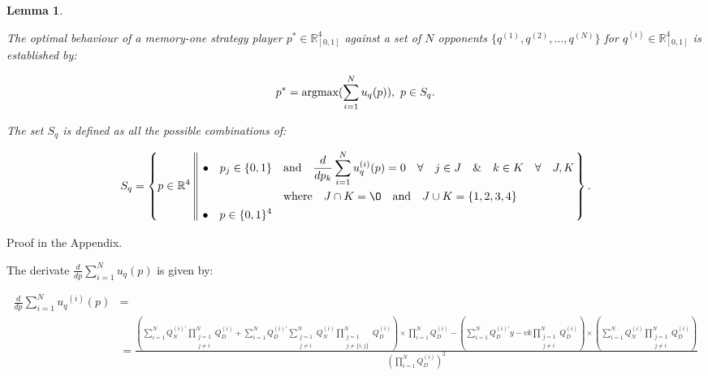 \documentclass[10pt]{article}
\newcommand{\R}{\mathbb{R}}
\newtheorem{lemma}[theorem]{Lemma}
\begin{document}
\begin{lemma}\label{lemma:memone_group_best_response}

    The optimal behaviour of a memory-one strategy player
    \(p^* \in \R_{[0, 1]} ^ 4\)
    against a set of \(N\) opponents \(\{q^{(1)}, q^{(2)}, \dots, q^{(N)} \}\)
    for \(q^{(i)} \in \R_{[0, 1]} ^ 4\) is established by:

    \[p^* = \textnormal{argmax}(\sum\limits_{i=1} ^ N  u_q(p)), \ p \in S_q.\]

    The set \(S_q\) is defined as all the possible combinations of:

    \[
        S_q =
        \left\{p \in \mathbb{R} ^ 4 \left\|\
            \begin{aligned}
                \bullet\quad p_j \in \{0, 1\} & \quad \text{and} \quad \frac{d}{dp_k} 
                \sum\limits_{i=1} ^ N  u_q^{(i)}(p) = 0
                \quad \forall \quad j \in J \quad \&  \quad k \in K  \quad \forall \quad J, K \\
                & \quad \text{where} \quad J \cap K = \O \quad
                \text{and} \quad J \cup K = \{1, 2, 3, 4\}\\
                \bullet\quad  p \in \{0, 1\} ^ 4
            \end{aligned}\right.
        \right\}.
    \]
\end{lemma}

Proof in the Appendix.

The derivate \(\frac{d}{dp} \sum\limits_{i=1} ^ N  u_q(p)\) is given by:

{\scriptsize
\begin{align}\label{eq:mo_tournament_derivative}
    \frac{d}{dp} \sum\limits_{i=1} ^ {N} {u_q}^{(i)} (p) & = \nonumber \\
    & =\frac{
    (\sum\limits_{i=1} ^ {N} Q_{N}^{(i)'} \prod_{\substack{j=1 \\ j \neq i}} ^ N Q_{D}^{(i)}
    + \sum\limits_{i=1} ^ {N} Q_{D}^{(i)'} \sum_{\substack{j=1 \\ j \neq i}} ^ {N} Q_{N}^{(i)}
   \prod_{\substack{j=1 \\ j \neq \{i, j\}}} ^ N Q_{D}^{(i)}) \times
   \prod\limits_{i=1} ^ N Q_{D}^{(i)} - (\sum\limits_{i=1} ^ {N} Q_{D}^{(i)'}y-vk
   \prod_{\substack{j=1 \\ j \neq i}} ^ N Q_{D}^{(i)}) \times
   (\sum\limits_{i=1} ^ {N} Q_{N}^{(i)} \prod_{\substack{j=1 \\ j \neq i}} ^ N Q_{D}^{(i)})}
    {(\prod\limits_{i=1} ^ N Q_{D}^{(i)})^{2}}
\end{align}
}
\end{document}
